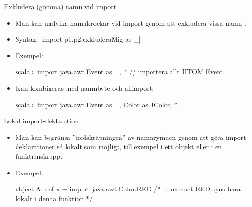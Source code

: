 \begin{Slide}{Exkludera (gömma) namn vid import}
\begin{itemize}
\item Man kan undvika namnkrockar vid import genom att exkludera vissa namn .
\item Syntax:  \code|import p1.p2.exkluderaMig as _|
\item Exempel:
\begin{REPL}
scala> import java.awt.{Event as _, *}  // importera allt UTOM Event
\end{REPL}
\item Kan kombineras med namnbyte och allimport:
\begin{REPL}
scala> import java.awt.{Event as _, Color as JColor, *}
\end{REPL}
\end{itemize}
\end{Slide}

\begin{Slide}{Lokal import-deklaration}
\begin{itemize}
\item Man kan begränsa ''nedskräpningen'' av namnrymden genom att göra import-deklarationer så lokalt som möjligt, till exempel i ett objekt eller i en funktionskropp.
\item Exempel:
\begin{Code}
object A:
  def x = 
    import java.awt.Color.RED
    /* ... namnet RED syns bara lokalt i denna funktion */
\end{Code}
\end{itemize}
\end{Slide}

